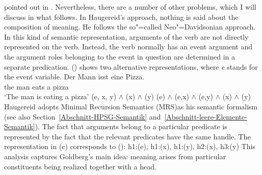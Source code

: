 \begin{exe}
\begin{xlist}[iv.]
\begin{exe}
\begin{xlist}[iv.]
pointed out in .
Nevertheless, there are a number of other problems, which I will discuss in what follows.
In Haugereid's approach, nothing is said about the composition of meaning. He follows the so"=called Neo"=Davidsonian approach.
In this kind of semantic representation, arguments of the verb are not directly represented on the verb.
Instead, the verb normally has an event argument and the argument roles belonging to the event in question are determined in a separate predication.
() shows two alternative representations, where \emph{e} stands for the event variable.
\eal
\ex 
\gll Der Mann isst eine Pizza.\\
	 the man eats a pizza\\
\glt `The man is eating a pizza'
\ex {}(e, x, y) $\wedge$ (x) $\wedge$ (y)
\ex {}(e) $\wedge$ (e,x) $\wedge$ (e,y) $\wedge$ (x) $\wedge$ (y)
\zl
\largerpage[2]
Haugereid adopts Minimal Recursion Semantics (MRS)\indexmrs as his semantic formalism (see also Section~\ref{Abschnitt-HPSG-Semantik} and~\ref{Abschnitt-leere-Elemente-Semantik}). 
The fact that arguments belong to a particular predicate is represented by the fact that the relevant predicates have the same handle. The representation in (c) corresponds
to ():
\ea
h1:(e), h1:(x), h1:(y), h2:(x), h3:(y)
\z
This analysis captures Goldberg's main idea: meaning arises from particular constituents being realized together with a head.


\end{xlist}
\end{exe}
\end{xlist}
\end{exe}
